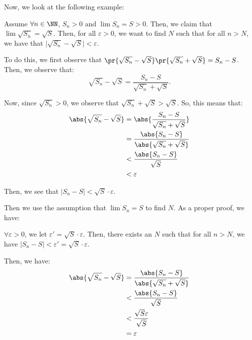 \documentclass[openany]{book}
\begin{document}
Now, we look at the following example:
\begin{example}
	Assume $\forall n \in \NN$, $S_n > 0$ and $\lim S_n = S > 0$. Then, we claim that $\lim \sqrt{S_n} = \sqrt{S}$. Then, for all $\varepsilon > 0$, we want to find $N$ such that for all $n > N$, we have that $\lvert \sqrt{S_n} - \sqrt{S} \rvert < \varepsilon$.
	
	To do this, we first observe that $\pr{\sqrt{S_n} - \sqrt{S}}\pr{\sqrt{S_n} + \sqrt{S}} = S_n - S$. Then, we observe that:
	\begin{equation*}
		\sqrt{S_n} - \sqrt{S} = \frac{S_n - S}{\sqrt{S_n} + \sqrt{S}}.
	\end{equation*}
	
	Now, since $\sqrt{S_n} > 0$, we observe that $\sqrt{S_n} + \sqrt{S} > \sqrt{S}$. So, this means that:
	\begin{align*}
		\abs{\sqrt{S_n} - \sqrt{S}} &= \abs{\frac{S_n - S}{\sqrt{S_n} + \sqrt{S}}} \\
		&= \frac{\abs{S_n - S}}{\abs{\sqrt{S_n} + \sqrt{S}}} \\
		&< \frac{\abs{S_n - S}}{\sqrt{S}} \\
		&< \varepsilon
	\end{align*}
	
	Then, we see that $\lvert S_n - S \rvert < \sqrt{S} \cdot \varepsilon$.
	
	Then we use the assumption that $\lim S_n = S$ to find $N$. As a proper proof, we have:
	\begin{innerproof}
		$\forall \varepsilon > 0$, we let $\varepsilon' = \sqrt{S} \cdot \varepsilon$. Then, there exists an $N$ such that for all $n > N$, we have $\lvert S_n - S \rvert < \varepsilon' = \sqrt{S} \cdot \varepsilon$.
		
		Then, we have:
		\begin{align*}
			\abs{\sqrt{S_n} - \sqrt{S}} &= \frac{\abs{S_n - S}}{\abs{\sqrt{S_n} + \sqrt{S}}} \\
			&< \frac{\abs{S_n - S}}{\sqrt{S}} \\
			&< \frac{\sqrt{S}\varepsilon}{\sqrt{S}} \\
			&= \varepsilon
		\end{align*}
	\end{innerproof}
\end{example}
\end{document}
